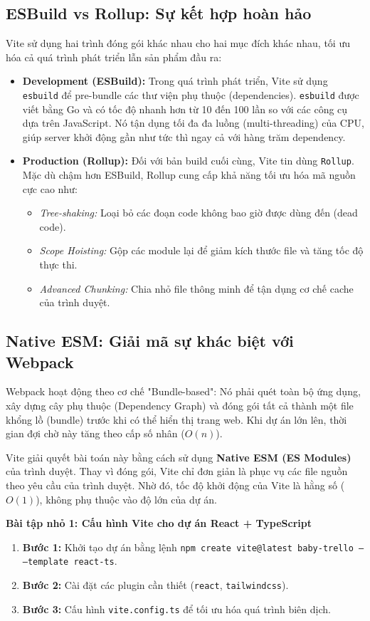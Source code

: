 \subsection{ESBuild vs Rollup: Sự kết hợp hoàn hảo}
Vite sử dụng hai trình đóng gói khác nhau cho hai mục đích khác nhau, tối ưu hóa cả quá trình phát triển lẫn sản phẩm đầu ra:
\begin{itemize}
    \item \textbf{Development (ESBuild):} Trong quá trình phát triển, Vite sử dụng \texttt{esbuild} để pre-bundle các thư viện phụ thuộc (dependencies). \texttt{esbuild} được viết bằng Go và có tốc độ nhanh hơn từ 10 đến 100 lần so với các công cụ dựa trên JavaScript. Nó tận dụng tối đa đa luồng (multi-threading) của CPU, giúp server khởi động gần như tức thì ngay cả với hàng trăm dependency.
    \item \textbf{Production (Rollup):} Đối với bản build cuối cùng, Vite tin dùng \texttt{Rollup}. Mặc dù chậm hơn ESBuild, Rollup cung cấp khả năng tối ưu hóa mã nguồn cực cao như:
    \begin{itemize}
        \item \textit{Tree-shaking:} Loại bỏ các đoạn code không bao giờ được dùng đến (dead code).
        \item \textit{Scope Hoisting:} Gộp các module lại để giảm kích thước file và tăng tốc độ thực thi.
        \item \textit{Advanced Chunking:} Chia nhỏ file thông minh để tận dụng cơ chế cache của trình duyệt.
    \end{itemize}
\end{itemize}

\subsection{Native ESM: Giải mã sự khác biệt với Webpack}
Webpack hoạt động theo cơ chế "Bundle-based": Nó phải quét toàn bộ ứng dụng, xây dựng cây phụ thuộc (Dependency Graph) và đóng gói tất cả thành một file khổng lồ (bundle) trước khi có thể hiển thị trang web. Khi dự án lớn lên, thời gian đợi chờ này tăng theo cấp số nhân ($O(n)$).

Vite giải quyết bài toán này bằng cách sử dụng \textbf{Native ESM (ES Modules)} của trình duyệt. Thay vì đóng gói, Vite chỉ đơn giản là phục vụ các file nguồn theo yêu cầu của trình duyệt. Nhờ đó, tốc độ khởi động của Vite là hằng số ($O(1)$), không phụ thuộc vào độ lớn của dự án.

\textbf{Bài tập nhỏ 1: Cấu hình Vite cho dự án React + TypeScript}
\begin{enumerate}
    \item \textbf{Bước 1:} Khởi tạo dự án bằng lệnh \texttt{npm create vite@latest baby-trello -- --template react-ts}.
    \item \textbf{Bước 2:} Cài đặt các plugin cần thiết (\texttt{react}, \texttt{tailwindcss}).
    \item \textbf{Bước 3:} Cấu hình \texttt{vite.config.ts} để tối ưu hóa quá trình biên dịch.
\end{enumerate}

